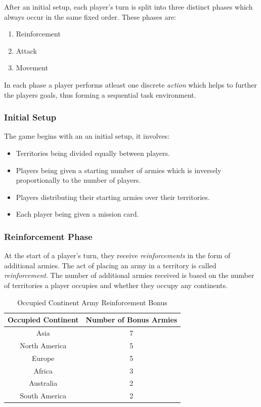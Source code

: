 \documentclass[parskip]{cs4rep}
\begin{document}
After an initial setup, each player's turn is split into three distinct phases which always occur in the same fixed order. These phases are:

\begin{enumerate}
\item
Reinforcement
\item
Attack
\item
Movement
\newline
\end{enumerate}

In each phase a player performs atleast one discrete \textit{action} which helps to further the players goals, thus forming a sequential task environment.

\subsubsection{Initial Setup}

The game begins with an an initial setup, it involves:

\begin{itemize}
\item
Territories being divided equally between players.
\item
Players being given a starting number of armies which is inversely proportionally to the number of players.
\item
Players distributing their starting armies over their territories.
\item
Each player being given a mission card.
\end{itemize}

\subsubsection{Reinforcement Phase}

At the start of a player's turn, they receive \textit{reinforcements} in the form of additional armies. The act of placing an army in a territory is called \textit{reinforcement}.  The number of additional armies received is based on the number of territories a player occupies and whether they occupy any continents.
\newline

\begin{table}[ht]
\centering
\begin{tabular}{|c|c|}
\hline 
\textbf{Occupied Continent} & \textbf{Number of Bonus Armies} \\ 
\hline 
Asia & 7 \\ 
\hline 
North America & 5 \\ 
\hline 
Europe & 5 \\ 
\hline 
Africa & 3 \\
\hline
Australia & 2 \\
\hline  
South America & 2 \\
\hline 
\end{tabular}
\caption{Occupied Continent Army Reinforcement Bonus}
\label{table:continent-bonus}
\end{table}
\end{document}

